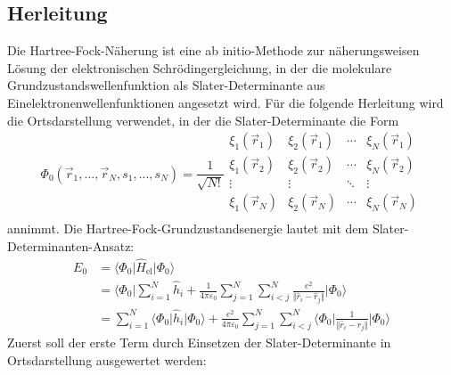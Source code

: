 \documentclass[9pt]{report}
\begin{document}
\subsection{Herleitung}
Die Hartree-Fock-Näherung ist eine ab initio-Methode zur näherungsweisen Lösung der elektronischen Schrödingergleichung, in der die molekulare Grundzustandswellenfunktion als Slater-Determinante aus Einelektronenwellenfunktionen angesetzt wird. Für die folgende Herleitung wird die Ortsdarstellung verwendet, in der die Slater-Determinante die Form
\begin{equation}
\Phi_{0}(\vec{r}_1,...,\vec{r}_N,s_1,...,s_N) = \frac{1}{\sqrt{N!}}\begin{array}{|cccc|}
\xi_{1}(\vec{r}_1)  &  \xi_{2}(\vec{r}_1)    & \cdots  &  \xi_{N}(\vec{r}_1) \\
\xi_{1}(\vec{r}_2)  &  \xi_{2}(\vec{r}_2)    & \cdots  &  \xi_{N}(\vec{r}_2) \\
\vdots  &  \vdots    & \ddots  &  \vdots \\
\xi_{1}(\vec{r}_N)  &  \xi_{2}(\vec{r}_N)    & \cdots  &  \xi_{N}(\vec{r}_N)\\
\end{array}
\end{equation}
annimmt. Die Hartree-Fock-Grundzustandsenergie lautet mit dem Slater-Determinanten-Ansatz:
\begin{align}
E_{0}&=\big\langle\Phi_{0}\big|\hat{H}_{\mathrm{el}}\big|\Phi_{0}\big\rangle\\
&=\bigg\langle\Phi_{0}\bigg|\sum_{i=1}^{N}\hat{h}_{i}+\frac{1}{4\pi\varepsilon_0}\sum_{j=1}^{N}\sum_{i<j}^{N}\frac{e^2}{\Vert\hat{r}_{i}-\hat{r}_{j}\Vert}\bigg|\Phi_{0}\bigg\rangle\\
&=\sum_{i=1}^{N}\big\langle\Phi_{0}\big|\hat{h}_{i}\big|\Phi_{0}\big\rangle +\frac{e^2}{4\pi\varepsilon_0}\sum_{j=1}^{N}\sum_{i<j}^{N}\Big\langle\Phi_{0}\Big|\frac{1}{\Vert\hat{r}_{i}-\hat{r}_{j}\Vert}\Big|\Phi_{0}\Big\rangle
\end{align}
Zuerst soll der erste Term durch Einsetzen der Slater-Determinante in Ortsdarstellung ausgewertet werden:
\end{document}
